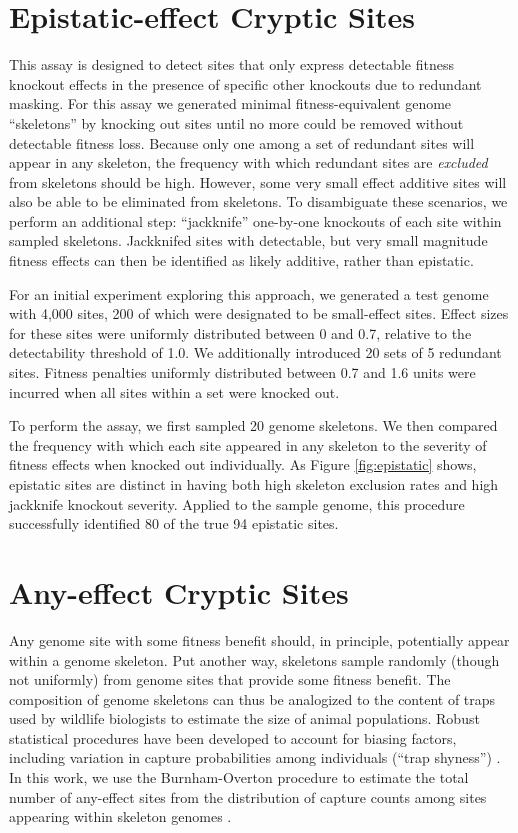 \section{Epistatic-effect Cryptic Sites}



This assay is designed to detect sites that only express detectable fitness knockout effects in the presence of specific other knockouts due to redundant masking.
For this assay we generated minimal fitness-equivalent genome ``skeletons'' by knocking out sites until no more could be removed without detectable fitness loss.
Because only one among a set of redundant sites will appear in any skeleton, the frequency with which redundant sites are \textit{excluded} from skeletons should be high.
However, some very small effect additive sites will also be able to be eliminated from skeletons.
To disambiguate these scenarios, we perform an additional step: ``jackknife'' one-by-one knockouts of each site within sampled skeletons.
Jackknifed sites with detectable, but very small magnitude fitness effects can then be identified as likely additive, rather than epistatic.

For an initial experiment exploring this approach, we generated a test genome with 4,000 sites, 200 of which were designated to be small-effect sites.
Effect sizes for these sites were uniformly distributed between 0 and 0.7, relative to the detectability threshold of 1.0.
We additionally introduced 20 sets of 5 redundant sites.
Fitness penalties uniformly distributed between 0.7 and 1.6 units were incurred when all sites within a set were knocked out.

To perform the assay, we first sampled 20 genome skeletons.
We then compared the frequency with which each site appeared in any skeleton to the severity of fitness effects when knocked out individually.
As Figure \ref{fig:epistatic} shows, epistatic sites are distinct in having both high skeleton exclusion rates and high jackknife knockout severity.
Applied to the sample genome, this procedure successfully identified 80 of the true 94 epistatic sites.

\section{Any-effect Cryptic Sites}

Any genome site with some fitness benefit should, in principle, potentially appear within a genome skeleton.
Put another way, skeletons sample randomly (though not uniformly) from genome sites that provide some fitness benefit.
The composition of genome skeletons can thus be analogized to the content of traps used by wildlife biologists to estimate the size of animal populations.
Robust statistical procedures have been developed to account for biasing factors, including variation in capture probabilities among individuals (``trap shyness'') \citep{amstrup2010handbook}.
In this work, we use the Burnham-Overton procedure to estimate the total number of any-effect sites from the distribution of capture counts among sites appearing within skeleton genomes \citep{burnham1979robust}.

